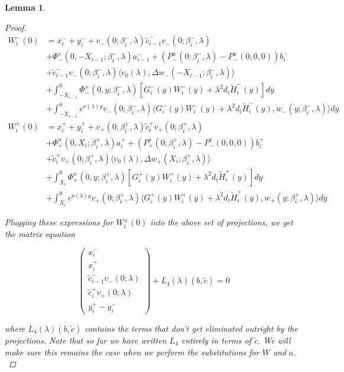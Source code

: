 \documentclass[12pt]{article}
\newtheorem{lemma}{Lemma}
\begin{document}
\begin{lemma}
\begin{proof}
\begin{align*}
W_i^-(0) &= x_i^- + y_i^- + v_-(0; \beta_i^-, \lambda) \tilde{c}_{i-1}^- v_-(0; \beta_i^-, \lambda) \\
&+\Phi^s_-(0, -X_{i-1}; \beta_i^-, \lambda)a_{i-1}^- + (P^u_-(0; \beta_i^-, \lambda) - P^u_-(0; 0, 0))b_i^- \\
&+ \tilde{c}_{i-1}^- v_-(0; \beta_i^-, \lambda) \langle v_0(\lambda), \Delta w_-(-X_{i-1}; \beta_i^-, \lambda) \rangle \\
&+ \int_{-X_{i-1}}^0 \Phi^s_-(0, y; \beta_i^-, \lambda) [ G_i^-(y)W_i^-(y) + \lambda^2 d_i \tilde{H}_i^-(y) ] dy \\
&+ \int_{-X_{i-1}}^0
e^{\nu(\lambda)y} v_-(0; \beta_i^-, \lambda) \langle G_i^-(y)W_i^-(y) + \lambda^2 d_i \tilde{H}_i^-(y), w_-(y; \beta_i^-, \lambda) \rangle dy \\
W_i^+(0) &= x_i^+ + y_i^+ + v_+(0; \beta_i^+, \lambda) \tilde{c}_i^+ v_+(0; \beta_i^+, \lambda) \\
&+\Phi^u_+(0, X_i; \beta_i^+, \lambda)a_i^+ + (P^s_+(0; \beta_i^+, \lambda) - P^s_-(0; 0, 0))b_i^+ \\
&+ \tilde{c}_i^+ v_+(0; \beta_i^+, \lambda) \langle v_0(\lambda), \Delta w_+(X_i; \beta_i^+, \lambda) \rangle \\  
&+ \int_{X_i}^0 \Phi^u_+(0, y; \beta_i^+, \lambda) [ G_i^+(y)W_i^+(y) + \lambda^2 d_i \tilde{H}_i^+(y) ] dy \\
&+ \int_{X_i}^0 e^{\nu(\lambda)y} v_+(0; \beta_i^+, \lambda) \langle G_i^+(y)W_i^+(y) + \lambda^2 d_i \tilde{H}_i^+(y), w_+(y; \beta_i^+, \lambda) \rangle dy
\end{align*}

Plugging these expressions for $W_i^\pm(0)$ into the above set of projections, we get the matrix equation

\[
\begin{pmatrix}x_i^- \\ x_i^+ \\ 
\tilde{c}_{i-1}^- v_-(0; \lambda) \\
\tilde{c}_i^+ v_+(0; \lambda) \\
y_i^+ - y_i^- \end{pmatrix} + L_4(\lambda)(b, \tilde{c}) = 0
\]

where $L_4(\lambda)(b, \tilde{c})$ contains the terms that don't get eliminated outright by the projections. Note that so far we have written $L_4$ entirely in terms of $\tilde{c}$. We will make sure this remains the case when we perform the substitutions for $W$ and $a$.\\


\end{proof}
\end{lemma}
\end{document}
